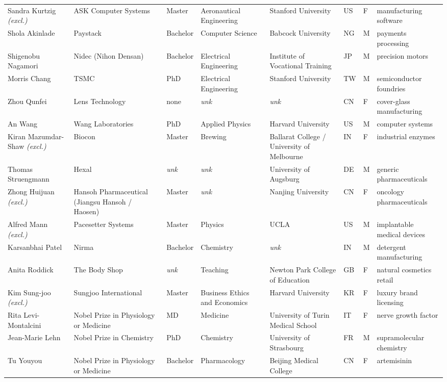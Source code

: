 \documentclass[11pt]{article}
\begin{document}
\begin{longtable}{@{}p{2.4cm}p{2.5cm}p{1.35cm}p{1.9cm}p{2.1cm}p{0.5cm}p{0.45cm}p{2.2cm}@{}}
Sandra Kurtzig \textit{\scriptsize(excl.)} & ASK Computer Systems & Master & Aeronautical Engineering & Stanford University & US & F & manufacturing software \\
Shola Akinlade & Paystack & Bachelor & Computer Science & Babcock University & NG & M & payments processing \\
Shigenobu Nagamori & Nidec (Nihon Densan) & Bachelor & Electrical Engineering & Institute of Vocational Training & JP & M & precision motors \\
Morris Chang & TSMC & PhD & Electrical Engineering & Stanford University & TW & M & semiconductor foundries \\
Zhou Qunfei & Lens Technology & none & \textit{unk} & \textit{unk} & CN & F & cover-glass manufacturing \\
An Wang & Wang Laboratories & PhD & Applied Physics & Harvard University & US & M & computer systems \\
Kiran Mazumdar-Shaw \textit{\scriptsize(excl.)} & Biocon & Master & Brewing & Ballarat College / University of Melbourne & IN & F & industrial enzymes \\
Thomas Struengmann & Hexal & \textit{unk} & \textit{unk} & University of Augsburg & DE & M & generic pharmaceuticals \\
Zhong Huijuan \textit{\scriptsize(excl.)} & Hansoh Pharmaceutical (Jiangsu Hansoh / Haosen) & Master & \textit{unk} & Nanjing University & CN & F & oncology pharmaceuticals \\
Alfred Mann \textit{\scriptsize(excl.)} & Pacesetter Systems & Master & Physics & UCLA & US & M & implantable medical devices \\
Karsanbhai Patel & Nirma & Bachelor & Chemistry & \textit{unk} & IN & M & detergent manufacturing \\
Anita Roddick & The Body Shop & \textit{unk} & Teaching & Newton Park College of Education & GB & F & natural cosmetics retail \\
Kim Sung-joo \textit{\scriptsize(excl.)} & Sungjoo International & Master & Business Ethics and Economics & Harvard University & KR & F & luxury brand licensing \\
Rita Levi-Montalcini & Nobel Prize in Physiology or Medicine & MD & Medicine & University of Turin Medical School & IT & F & nerve growth factor \\
Jean-Marie Lehn & Nobel Prize in Chemistry & PhD & Chemistry & University of Strasbourg & FR & M & supramolecular chemistry \\
Tu Youyou & Nobel Prize in Physiology or Medicine & Bachelor & Pharmacology & Beijing Medical College & CN & F & artemisinin \\

\end{longtable}
\end{document}
